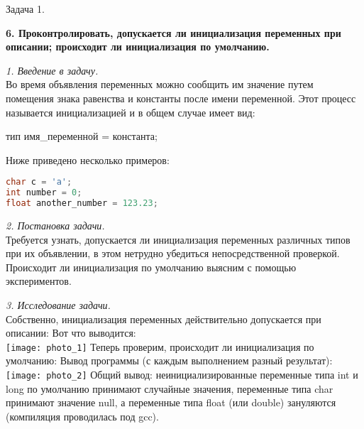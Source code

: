 \documentclass{article}
\begin{document}
\begin{section}{Задача 1.}

\begin{center}
    \textbf{6. Проконтролировать, допускается ли инициализация переменных при описании; происходит ли инициализация по умолчанию.}
\end{center}

{\itshape 1. Введение в задачу.}\\
Во время объявления переменных можно сообщить им значение путем помещения знака равенства и константы после имени переменной. Этот процесс называется инициализацией и в общем случае имеет вид:
\begin{center}
тип имя\_переменной = константа;
\end{center}
Ниже приведено несколько примеров:
\begin{lstlisting}[language=C]
char c = 'a';
int number = 0;
float another_number = 123.23;
\end{lstlisting}

{\itshape 2. Постановка задачи.}\\
Требуется узнать, допускается ли инициализация переменных различных типов при их объявлении, в этом нетрудно убедиться непосредственной проверкой. Происходит ли инициализация по умолчанию выясним с помощью экспериментов.

{\itshape 3. Исследование задачи.}\\
Собственно, инициализация переменных действительно допускается при описании:
Вот что выводится:\\
\texttt{[image: photo\_1]}
Теперь проверим, происходит ли инициализация по умолчанию:
Вывод программы (с каждым выполнением разный результат):\\
\texttt{[image: photo\_2]}
Общий вывод: неинициализированные переменные типа int и long по умолчанию принимают случайные значения, переменные типа char принимают значение null, а переменные типа float (или double) зануляются (компиляция проводилась под gcc).
\end{section}
\end{document}
